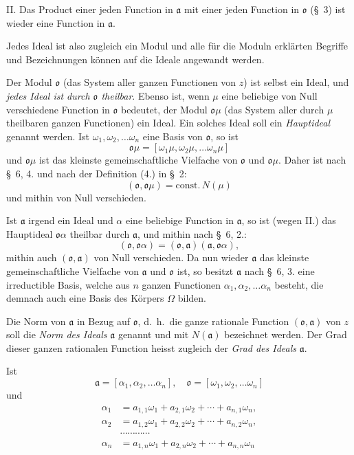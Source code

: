 \documentclass{article}
\begin{document}
II. Das Product einer jeden Function in $\mathfrak{a}$ mit einer jeden Function in $\mathfrak{o}$ (§~3) ist wieder eine Function in $\mathfrak{a}$.

Jedes Ideal ist also zugleich ein Modul und alle für die Moduln erklärten Begriffe und Bezeichnungen können auf die Ideale angewandt werden.

Der Modul $\mathfrak{o}$ (das System aller ganzen Functionen von $z$) ist selbst ein Ideal, und \emph{jedes Ideal ist durch $\mathfrak{o}$ theilbar}. Ebenso ist, wenn $\mu$ eine beliebige von Null verschiedene Function in $\mathfrak{o}$ bedeutet, der Modul $\mathfrak{o}\mu$ (das System aller durch $\mu$ theilbaren ganzen Functionen) ein Ideal. Ein solches Ideal soll ein \emph{Hauptideal} genannt werden. Ist $\omega_{1}, \omega_{2}, \ldots \omega_{n}$ eine Basis von $\mathfrak{o}$, so ist
\[ \mathfrak{o}\mu = [\omega_{1}\mu, \omega_{2}\mu, \ldots \omega_{n}\mu] \]
und $\mathfrak{o}\mu$ ist das kleinste gemeinschaftliche Vielfache von $\mathfrak{o}$ und $\mathfrak{o}\mu$. Daher ist nach §~6, 4. und nach der Definition (4.) in §~2:
\[ (\mathfrak{o}, \mathfrak{o}\mu) = \text{const.}\,N(\mu) \tag{1.} \]
und mithin von Null verschieden.

Ist $\mathfrak{a}$ irgend ein Ideal und $\alpha$ eine beliebige Function in $\mathfrak{a}$, so ist (wegen II.) das Hauptideal $\mathfrak{o}\alpha$ theilbar durch $\mathfrak{a}$, und mithin nach §~6, 2.:
\[ (\mathfrak{o}, \mathfrak{o}\alpha) = (\mathfrak{o}, \mathfrak{a})(\mathfrak{a}, \mathfrak{o}\alpha), \tag{2.} \]
mithin auch $(\mathfrak{o}, \mathfrak{a})$ von Null verschieden. Da nun wieder $\mathfrak{a}$ das kleinste gemeinschaftliche Vielfache von $\mathfrak{a}$ und $\mathfrak{o}$ ist, so besitzt $\mathfrak{a}$ nach §~6, 3. eine irreductible Basis, welche aus $n$ ganzen Functionen $\alpha_{1}, \alpha_{2}, \ldots \alpha_{n}$ besteht, die demnach auch eine Basis des Körpers $\Omega$ bilden.

Die Norm von $\mathfrak{a}$ in Bezug auf $\mathfrak{o}$, d.\ h.\ die ganze rationale Function $(\mathfrak{o}, \mathfrak{a})$ von $z$ soll die \emph{Norm des Ideals} $\mathfrak{a}$ genannt und mit $N(\mathfrak{a})$ bezeichnet werden. Der Grad dieser ganzen rationalen Function heisst zugleich der \emph{Grad des Ideals} $\mathfrak{a}$.

Ist
\[ \mathfrak{a} = [\alpha_{1}, \alpha_{2}, \ldots \alpha_{n}], \quad \mathfrak{o} = [\omega_{1}, \omega_{2}, \ldots \omega_{n}] \]
und
\[ \begin{aligned} \alpha_{1} &= a_{1,1}\omega_{1} + a_{2,1}\omega_{2} + \cdots + a_{n,1}\omega_{n}, \\ \alpha_{2} &= a_{1,2}\omega_{1} + a_{2,2}\omega_{2} + \cdots + a_{n,2}\omega_{n}, \\ &\cdots\cdots\cdots\cdots \\ \alpha_{n} &= a_{1,n}\omega_{1} + a_{2,n}\omega_{2} + \cdots + a_{n,n}\omega_{n} \end{aligned} \]
\end{document}
